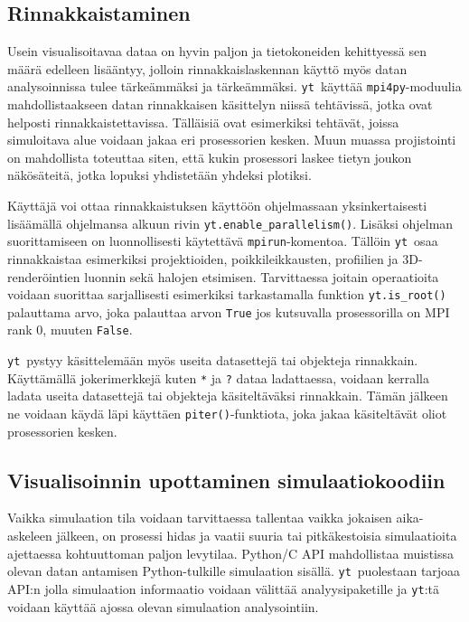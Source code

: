 \documentclass[12pt,a4paper]{article}
\newcommand{\yt}{\texttt{yt}}
\begin{document}
\subsection{Rinnakkaistaminen}
Usein visualisoitavaa dataa on hyvin paljon ja tietokoneiden kehittyessä sen määrä edelleen lisääntyy, jolloin rinnakkaislaskennan käyttö myös datan analysoinnissa tulee tärke\-äm\-mäksi ja tärkeämmäksi. \yt\ käyttää \texttt{mpi4py}-moduulia mahdollistaakseen datan rinnakkaisen käsittelyn niissä tehtävissä, jotka ovat helposti rinnakkaistettavissa. Tälläisiä ovat esimerkiksi tehtävät, joissa simuloitava alue voidaan jakaa eri prosessorien kesken. Muun muassa projistointi on mahdollista toteuttaa siten, että kukin prosessori laskee tietyn joukon näkösäteitä, jotka lopuksi yhdistetään yhdeksi plotiksi.\cite{yt}

Käyttäjä voi ottaa rinnakkaistuksen käyttöön ohjelmassaan yksinkertaisesti lisäämällä ohjelmansa alkuun rivin \texttt{yt.enable\_parallelism()}. Lisäksi ohjelman suorittamiseen on luonnollisesti käytettävä \texttt{mpirun}-komentoa. Tällöin \yt\ osaa rinnakkaistaa esimerkiksi projektioiden, poikkileikkausten, profiilien ja 3D-renderöintien luonnin sekä halojen etsimisen. Tarvittaessa joitain operaatioita voidaan suorittaa sarjallisesti esimerkiksi tarkastamalla funktion \texttt{yt.is\_root()} palauttama arvo, joka palauttaa arvon \texttt{True} jos kutsuvalla prosessorilla on MPI rank 0, muuten \texttt{False}. \cite{yt, parallel}

\yt\ pystyy käsittelemään myös useita datasettejä tai objekteja rinnakkain. Käyttämällä jokerimerkkejä kuten \texttt{*} ja \texttt{?} dataa ladattaessa, voidaan kerralla ladata useita datasettejä tai objekteja käsiteltäväksi rinnakkain. Tämän jälkeen ne voidaan käydä läpi käyttäen \texttt{piter()}-funktiota, joka jakaa käsiteltävät oliot prosessorien kesken. \cite{parallel}%

\subsection{Visualisoinnin upottaminen simulaatiokoodiin}
Vaikka simulaation tila voidaan tarvittaessa tallentaa vaikka jokaisen aika-askeleen jälkeen, on prosessi hidas ja vaatii suuria tai pitkäkestoisia simulaatioita ajettaessa kohtuuttoman paljon levytilaa. Python/C API mahdollistaa muistissa olevan datan antamisen Python-tulkille simulaation sisällä. \yt\ puolestaan tarjoaa API:n jolla simulaation informaatio voidaan välittää analyysipaketille ja \yt :tä voidaan käyttää ajossa olevan simulaation analysointiin. \cite{yt}
\end{document}

